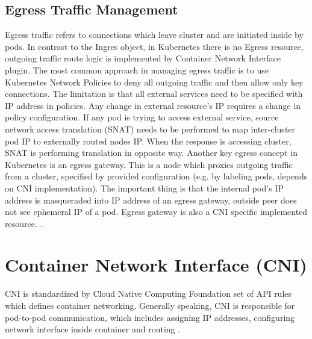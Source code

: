 
\subsection{Egress Traffic Management}
\label{sec:egressTrafficMngmnt}

Egress traffic refers to connections which leave cluster and are initiated inside by pods. In contrast to the Ingres object, in Kubernetes there is no Egress resource, outgoing traffic route logic is implemented by Container Network Interface plugin. The most common approach in managing egress traffic is to use Kubernetes Network Policies to deny all outgoing traffic and then allow only key connections. The limitation is that all external services need to be specified with IP address in policies. Any change in external resource's IP requires a change in policy configuration. If any pod is trying to access external service, source network access translation (SNAT) needs to be performed to map inter-cluster pod IP to externally routed nodes IP. When the response is accessing cluster, SNAT is performing translation in opposite way. Another key egress concept in Kubernetes is an egress gateway. This is a node which proxies outgoing traffic from a cluster, specified by provided configuration (e.g. by labeling pods, depends on CNI implementation). The important thing is that the internal pod's IP address is masqueraded into IP address of an egress gateway, outside peer does not see ephemeral IP of a pod. Egress gateway is also a CNI specific implemented resource. \cite{CalicoEgress} \cite{CiliumEgressGateway}. 



\section{Container Network Interface (CNI)}
\label{sec:cni}
CNI is standardized by Cloud Native Computing Foundation set of API rules which defines container networking. Generally speaking, CNI is responsible for pod-to-pod communication, which includes assigning IP addresses, configuring network interface inside container and routing \cite{IBMKubernetesNetworking}. 




